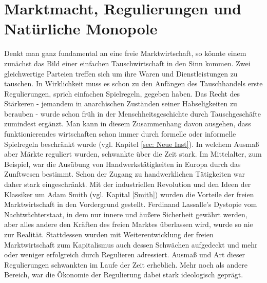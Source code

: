 \section{Marktmacht, Regulierungen und Natürliche Monopole}
\label{Disease}

Denkt man ganz fundamental an eine freie Marktwirtschaft, so könnte einem zunächst das Bild einer einfachen Tauschwirtschaft in den Sinn kommen. Zwei gleichwertige Parteien treffen sich um ihre Waren und Dienstleistungen zu tauschen. In Wirklichkeit muss es schon zu den Anfängen des Tauschhandels erste Regulierungen, sprich einfachen Spielregeln, gegeben haben. Das Recht des Stärkeren - jemandem in anarchischen Zuständen seiner Habseligkeiten zu berauben - wurde schon früh in der Menschheitsgeschichte durch Tauschgeschäfte zumindest ergänzt. Man kann in diesem Zusammenhang davon ausgehen, dass funktionierendes wirtschaften schon immer durch formelle oder informelle Spielregeln beschränkt wurde (vgl. Kapitel \ref{sec: Neue Inst}). In welchem Ausmaß aber Märkte reguliert wurden, schwankte über die Zeit stark. Im Mittelalter, zum Beispiel, war die Ausübung von Handwerkstätigkeiten in Europa durch das Zunftwesen bestimmt. Schon der Zugang zu handwerklichen Tätigkeiten war daher stark eingeschränkt. Mit der industriellen Revolution und den Ideen der Klassiker um Adam Smith (vgl. Kapital \ref{Smith}) wurden die Vorteile der freien Marktwirtschaft in den Vordergrund gestellt. Ferdinand Lassalle's Dystopie vom Nachtwächterstaat, in dem nur innere und äußere Sicherheit gewährt werden, aber alles andere den Kräften des freien Marktes überlassen wird, wurde so nie zur Realität. Stattdessen wurden mit Weiterentwicklung der freien Marktwirtschaft zum Kapitalismus auch dessen Schwächen aufgedeckt und mehr oder weniger erfolgreich durch Regulieren adressiert. Ausmaß und Art dieser Regulierungen schwankten im Laufe der Zeit erheblich. Mehr noch als andere Bereich, war die Ökonomie der Regulierung dabei stark ideologisch geprägt.

